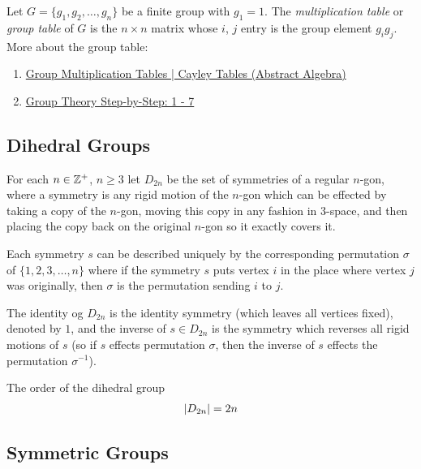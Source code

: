 {Let $G=\{g_{1},g_{2},\dots,g_{n}\}$ be a finite group with $g_{1} = 1$.
The {\sl multiplication table} or {\sl group table} of $G$ is the $n\times n$ matrix
whose $i$, $j$ entry is the group element $g_{i}g_{j}$.
}
More about the group table:
\begin{enumerate}[leftmargin=20pt, itemsep=0pt, topsep=0pt]
    \item \href{https://youtu.be/BwHspSCXFNM?si=1ucTvpLN6bGUYX9v}{Group Multiplication Tables | Cayley Tables (Abstract Algebra)}
    \item \href{https://youtu.be/tGCqP2ytP14?si=3P4tafGvrpjJWQyd}{Group Theory Step-by-Step: 1 - 7}
\end{enumerate}

\newpage
\thispagestyle{evenpagestyle}
\subsection{Dihedral Groups}
For each $n\in \mathbb{Z}^{+}$, $n\ge 3$ let $D_{2n}$ be the set of symmetries
of a regular $n$-gon, where a symmetry is any rigid motion of the $n$-gon which can
be effected by taking a copy of the $n$-gon, moving this copy in any fashion in $3$-space,
and then placing the copy back on the original $n$-gon so it exactly covers it.

Each symmetry $s$ can be described uniquely by the corresponding permutation $\sigma$
of $\{1,2,3,\dots,n\}$ where if the symmetry $s$ puts vertex $i$ in the place where vertex $j$
was originally, then $\sigma$ is the permutation sending $i$ to $j$.

The identity og $D_{2n}$ is the identity symmetry (which leaves all vertices fixed), denoted by $1$,
and the inverse of $s\in D_{2n}$ is the symmetry which reverses all rigid motions of $s$
(so if $s$ effects permutation $\sigma$, then the inverse of $s$ effects the permutation $\sigma^{-1}$).

{The order of the dihedral group
\begin{align*}
    \left\vert D_{2n} \right\vert = 2n
\end{align*}
}
{}
\begin{center}
    
\end{center}


\subsection{Symmetric Groups}










